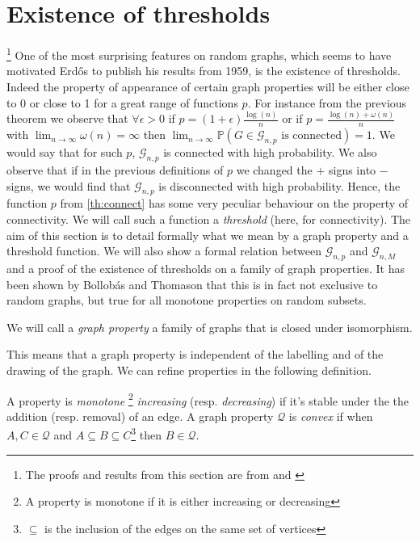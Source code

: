 \section{Existence of thresholds}\footnote{ The proofs and results from this section are from \cite{JLR} and \cite{Bollob01}}
One of the most surprising features on random graphs, which seems to have motivated Erd\H{o}s to publish his results from 1959, is the existence of thresholds.
Indeed the property of appearance of certain graph properties will be either close to 0 or close to 1 for a great range of functions $p$.
\newline
For instance from the previous theorem we observe that $\forall \epsilon > 0$  if $p = (1+\epsilon)\frac{\log(n)}{n}$ 
or if $p = \frac{\log(n) + \omega(n)}{n}$ with $\lim_{n\to \infty} \omega(n) = \infty$ then $\lim_{n\to\infty}\mathbb{P}(G \in \mathcal{G}_{n,p} \text{ is connected}) = 1$.
We would say that for such $p$, $\mathcal{G}_{n,p}$ is connected with high probability.
We also observe that if in the previous definitions of $p$ we changed the $+$ signs into $-$ signs, we would find that $\mathcal{G}_{n,p}$ is disconnected with high probability.
\newline
Hence, the function $p$ from \eqref{th:connect} has some very peculiar behaviour on the property of connectivity.
We will call such a function a \emph{threshold} (here, for connectivity).
\newline
The aim of this section is to detail formally what we mean by a graph property and a threshold function.
We will also show a formal relation between $\mathcal{G}_{n,p}$ and $\mathcal{G}_{n,M}$ and a proof of the existence of thresholds on a family of graph properties.
\newline
It has been shown by Bollob\'as and Thomason \cite{Bollob87} that this is in fact not exclusive to random graphs, but true for all monotone properties on random subsets.
\begin{definition}
	We will call a \emph{graph property} a family of graphs that is closed under isomorphism.
\end{definition}
This means that a graph property is independent of the labelling and of the drawing of the graph.
We can refine properties in the following definition.
\begin{definition}
	A property is \emph{monotone }\footnote{ A property is monotone if it is either increasing or decreasing} \emph{increasing} (resp. \emph{decreasing}) if it's stable under the the addition (resp. removal) of an edge.
	A graph property $\mathcal{Q}$ is \emph{convex} if when $ A,C \in \mathcal{Q}$ and $A\subseteq B\subseteq C$\footnote{ $\subseteq$ is the inclusion of the edges on the same set of vertices} then $B \in \mathcal{Q}$. 
\end{definition}


